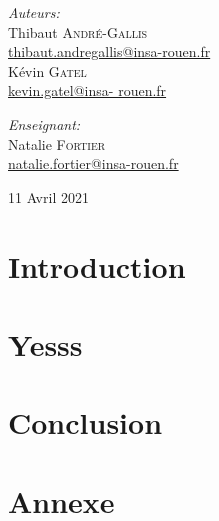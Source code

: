 \documentclass[12,french]{report}
\begin{document}
\begin{titlepage}
\begin{center}
	\begin{minipage}{0.4\textwidth}
		\begin{flushleft} \large
			\emph{Auteurs:}\\
			Thibaut \textsc{André-Gallis} \\
			{\small\href{mailto:thibaut.andregallis@insa-rouen.fr}{thibaut.andregallis@insa-rouen.fr}} \\
			Kévin \textsc{Gatel} \\
			{\small\href{mailto:kevin.gatel@insa-rouen.fr}{kevin.gatel@insa-				rouen.fr}}
		\end{flushleft}
	\end{minipage}
	\begin{minipage}{0.4\textwidth}
		\begin{flushright} \large
			\emph{Enseignant:} \\
			Natalie \textsc{Fortier} \\
			{\small\href{mailto:natalie.fortier@insa-rouen.fr}								{natalie.fortier@insa-rouen.fr}}
		\end{flushright}
	\end{minipage}

	\vfill
	{\large 11 Avril 2021}
\end{center}
\end{titlepage}

\tableofcontents


\renewcommand{\chaptername}{}
\chapter*{Introduction}

\chapter{Yesss}

\chapter*{Conclusion}



\chapter*{Annexe}
\end{document}
